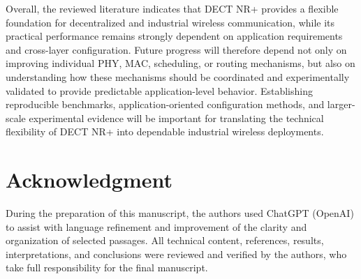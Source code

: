 Overall, the reviewed literature indicates that DECT NR+ provides a flexible
foundation for decentralized and industrial wireless communication, while its
practical performance remains strongly dependent on application requirements
and cross-layer configuration. Future progress will therefore depend not only
on improving individual PHY, MAC, scheduling, or routing mechanisms, but also
on understanding how these mechanisms should be coordinated and experimentally
validated to provide predictable application-level behavior. Establishing
reproducible benchmarks, application-oriented configuration methods, and
larger-scale experimental evidence will be important for translating the
technical flexibility of DECT NR+ into dependable industrial wireless
deployments.

\section*{Acknowledgment}

During the preparation of this manuscript, the authors used ChatGPT
(OpenAI) to assist with language refinement and improvement of the clarity
and organization of selected passages. All technical content, references,
results, interpretations, and conclusions were reviewed and verified by
the authors, who take full responsibility for the final manuscript.